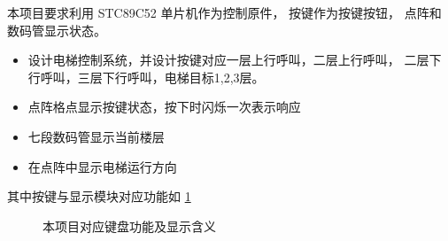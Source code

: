 \documentclass[../main.tex]{subfiles} %
\begin{document}
本项目要求利用 STC89C52 单片机作为控制原件，
按键作为按键按钮，
点阵和数码管显示状态。

\begin{itemize}
  \item 设计电梯控制系统，并设计按键对应一层上行呼叫，二层上行呼叫，
    二层下行呼叫，三层下行呼叫，电梯目标1,2,3层。
  \item 点阵格点显示按键状态，按下时闪烁一次表示响应
  \item 七段数码管显示当前楼层
  \item 在点阵中显示电梯运行方向
\end{itemize}

其中按键与显示模块对应功能如%
\cref{fig:function}
\begin{figure}[H]
  \centering
  \def\svgwidth{\linewidth}
  
  \caption{本项目对应键盘功能及显示含义}
  \label{fig:function}
\end{figure}
\end{document}
